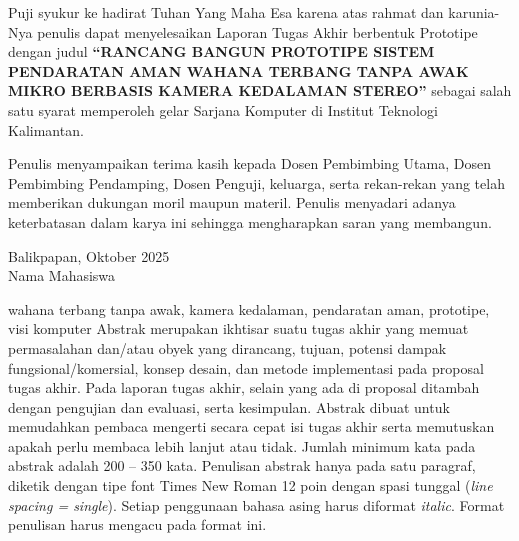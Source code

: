 \documentclass[prototipe,laporan]{itkta2025}
\begin{document}
\makecover
\makeorisinalitas
\makepublikasi
\makepengeshan

Puji syukur ke hadirat Tuhan Yang Maha Esa karena atas rahmat dan karunia-Nya penulis dapat menyelesaikan Laporan Tugas Akhir berbentuk Prototipe dengan judul \textbf{``RANCANG BANGUN PROTOTIPE SISTEM PENDARATAN AMAN WAHANA TERBANG TANPA AWAK MIKRO BERBASIS KAMERA KEDALAMAN STEREO''} sebagai salah satu syarat memperoleh gelar Sarjana Komputer di Institut Teknologi Kalimantan.

Penulis menyampaikan terima kasih kepada Dosen Pembimbing Utama, Dosen Pembimbing Pendamping, Dosen Penguji, keluarga, serta rekan-rekan yang telah memberikan dukungan moril maupun materil. Penulis menyadari adanya keterbatasan dalam karya ini sehingga mengharapkan saran yang membangun.

\vspace{1.2cm}
\begin{flushright}
  Balikpapan, Oktober 2025\\[1.5cm]
  Nama Mahasiswa
\end{flushright}

\begin{abstrakid}{wahana terbang tanpa awak, kamera kedalaman, pendaratan aman, prototipe, visi komputer}
Abstrak merupakan ikhtisar suatu tugas akhir yang memuat permasalahan dan/atau obyek yang dirancang, tujuan, potensi dampak fungsional/komersial, konsep desain, dan metode implementasi pada proposal tugas akhir. Pada laporan tugas akhir, selain yang ada di proposal ditambah dengan pengujian dan evaluasi, serta kesimpulan. Abstrak dibuat untuk memudahkan pembaca mengerti secara cepat isi tugas akhir serta memutuskan apakah perlu membaca lebih lanjut atau tidak. Jumlah minimum kata pada abstrak adalah 200 -- 350 kata. Penulisan abstrak hanya pada satu paragraf, diketik dengan tipe font Times New Roman 12 poin dengan spasi tunggal (\textit{line spacing = single}). Setiap penggunaan bahasa asing harus diformat \textit{italic}. Format penulisan harus mengacu pada format ini.
\end{abstrakid}
\end{document}
